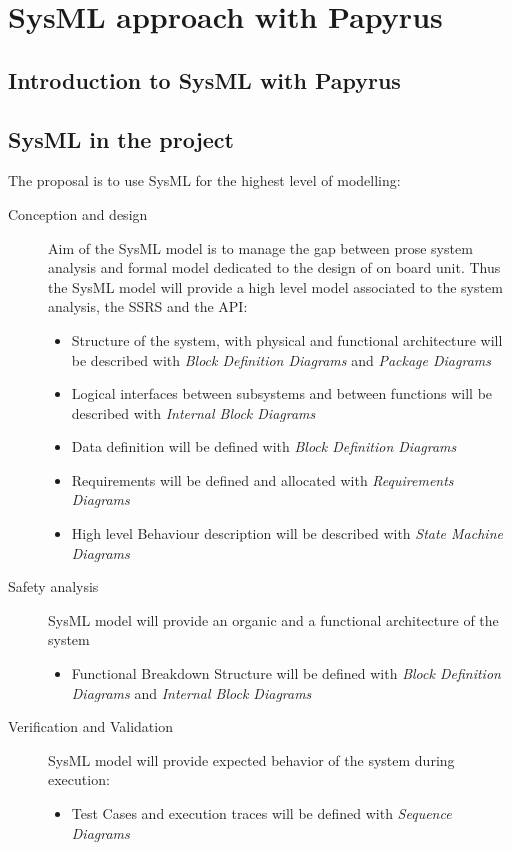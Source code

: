 
\section{SysML approach with Papyrus}

\subsection{Introduction to SysML with Papyrus}

\subsection{SysML in the project}

The proposal is to use SysML for the highest level of modelling:
\begin{description}
\item[Conception and design] Aim of the SysML model is to manage the gap  between prose system analysis and formal model dedicated to the design of on board unit. Thus the SysML model will provide a high level model associated to the system analysis, the SSRS and the API:
\begin{itemize}
\item Structure of the system, with physical and functional architecture will be described with \textit{Block Definition Diagrams} and \textit{Package Diagrams}
\item Logical interfaces between subsystems and between functions will be described with \textit{Internal Block Diagrams}
\item Data definition will be defined with \textit{Block Definition Diagrams}
\item Requirements will be defined and allocated with \textit{Requirements Diagrams}
\item High level Behaviour description will be described with \textit{State Machine Diagrams}
\end{itemize}
\item[Safety analysis] SysML model will provide an organic and a functional architecture of the system
\begin{itemize}
\item Functional Breakdown Structure will be defined with \textit{Block Definition Diagrams} and \textit{Internal Block Diagrams}
\end{itemize}
\item[Verification and Validation] SysML model will provide expected behavior of the system during execution: 
\begin{itemize}
\item Test Cases and execution traces will be defined with \textit{Sequence Diagrams}
\end{itemize}
\end{description}

